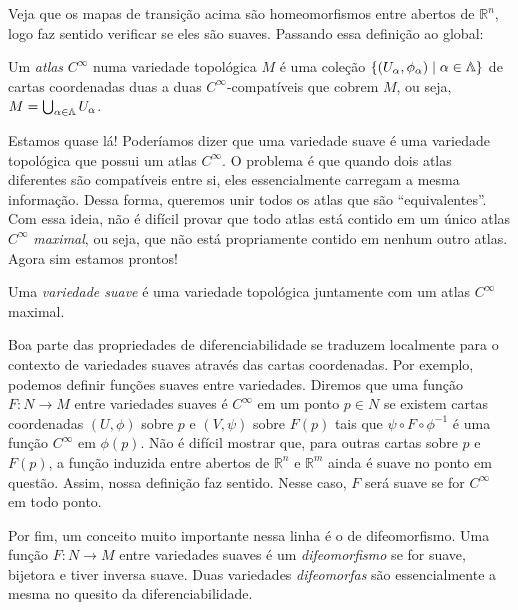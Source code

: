 Veja que os mapas de transição acima são homeomorfismos entre abertos de $\mathbb R^n$, logo faz sentido verificar se eles são suaves. Passando essa definição ao global:

\begin{definicao}[Atlas]
	Um \textit{atlas} $C^{\infty}$ numa variedade topológica $M$ é uma coleção $\{(U_{\alpha}, \phi_{\alpha}) \mid \alpha \in \LLambda\}$ de cartas coordenadas duas a duas $C^{\infty}$-compatíveis que cobrem $M$, ou seja, $M = \bigcup_{\alpha\in \LLambda} U_{\alpha}$.
\end{definicao}

Estamos quase lá! Poderíamos dizer que uma variedade suave é uma variedade topológica que possui um atlas $C^{\infty}$. O problema é que quando dois atlas diferentes são compatíveis entre si, eles essencialmente carregam a mesma informação. Dessa forma, queremos unir todos os atlas que são ``equivalentes''. Com essa ideia, não é difícil provar que todo atlas está contido em um único atlas $C^{\infty}$ \textit{maximal}, ou seja, que não está propriamente contido em nenhum outro atlas. Agora sim estamos prontos!

\begin{definicao}
	Uma \textit{variedade suave} é uma variedade topológica juntamente com um atlas $C^{\infty}$ maximal.
\end{definicao}

Boa parte das propriedades de diferenciabilidade se traduzem localmente para o contexto de variedades suaves através das cartas coordenadas. Por exemplo, podemos definir funções suaves entre variedades. Diremos que uma função $F: N \longrightarrow M$ entre variedades suaves é $C^{\infty}$ em um ponto $p \in N$ se existem cartas coordenadas $(U, \phi)$ sobre $p$ e $(V, \psi)$ sobre $F(p)$ tais que $\psi \circ F \circ \phi^{-1}$ é uma função $C^{\infty}$ em $\phi(p)$. Não é difícil mostrar que, para outras cartas sobre $p$ e $F(p)$, a função induzida entre abertos de $\mathbb R^n$ e $\mathbb R^m$ ainda é suave no ponto em questão. Assim, nossa definição faz sentido. Nesse caso, $F$ será suave se for $C^{\infty}$ em todo ponto.

Por fim, um conceito muito importante nessa linha é o de difeomorfismo. Uma função $F: N \longrightarrow M$ entre variedades suaves é um \textit{difeomorfismo} se for suave, bijetora e tiver inversa suave. Duas variedades \textit{difeomorfas} são essencialmente a mesma no quesito da diferenciabilidade. 

